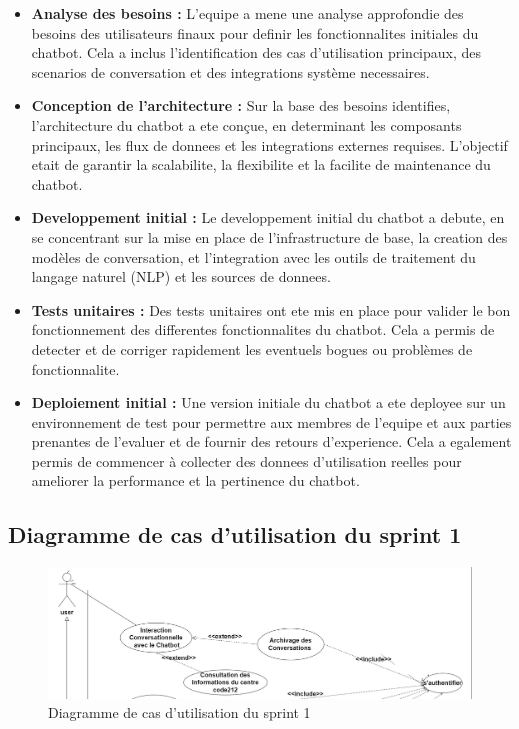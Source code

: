 \documentclass[a4paper, 11pt, openany]{report}
\begin{document}
\begin{itemize}
    \item \textbf{Analyse des besoins :} L'equipe a mene une analyse approfondie des besoins des utilisateurs finaux pour definir les fonctionnalites initiales du chatbot. Cela a inclus l'identification des cas d'utilisation principaux, des scenarios de conversation et des integrations système necessaires.
    
    \item \textbf{Conception de l'architecture :} Sur la base des besoins identifies, l'architecture du chatbot a ete conçue, en determinant les composants principaux, les flux de donnees et les integrations externes requises. L'objectif etait de garantir la scalabilite, la flexibilite et la facilite de maintenance du chatbot.
    
    \item \textbf{Developpement initial :} Le developpement initial du chatbot a debute, en se concentrant sur la mise en place de l'infrastructure de base, la creation des modèles de conversation, et l'integration avec les outils de traitement du langage naturel (NLP) et les sources de donnees.
    
    \item \textbf{Tests unitaires :} Des tests unitaires ont ete mis en place pour valider le bon fonctionnement des differentes fonctionnalites du chatbot. Cela a permis de detecter et de corriger rapidement les eventuels bogues ou problèmes de fonctionnalite.
    
    \item \textbf{Deploiement initial :} Une version initiale du chatbot a ete deployee sur un environnement de test pour permettre aux membres de l'equipe et aux parties prenantes de l'evaluer et de fournir des retours d'experience. Cela a egalement permis de commencer à collecter des donnees d'utilisation reelles pour ameliorer la performance et la pertinence du chatbot.
\end{itemize}

\subsection{Diagramme de cas d'utilisation du sprint 1}
\begin{figure}[H]
\centering
\includegraphics[width=\textwidth]{assets/images/sprint1-usecase.png}
\caption{Diagramme de cas d'utilisation du sprint 1}
\label{fig:sprint1_usecase}
\end{figure}
\end{document}
